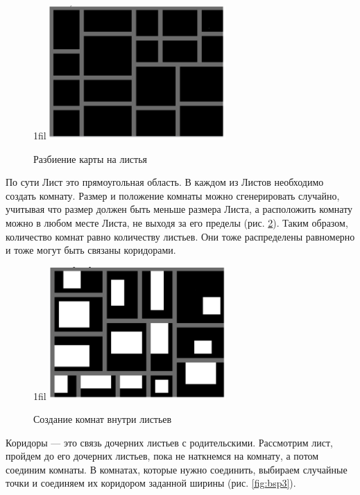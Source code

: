 \documentclass[a4paper,12pt]{report}
\makeatletter
\newcommand*{\centerfloat}{%
  \parindent \z@
  \leftskip \z@ \@plus 1fil \@minus \textwidth
  \rightskip\leftskip
  \parfillskip \z@skip}
\makeatother
\begin{document}
\begin{figure}
    \centerfloat
    \includegraphics[width=0.6\textwidth]{levels/2.png}
    \caption{Разбиение карты на листья \citep{bsp}}
    \label{fig:bsp}
\end{figure}

По сути Лист это прямоугольная область. В каждом из Листов необходимо создать комнату. Размер и положение комнаты можно сгенерировать случайно, учитывая что размер должен быть меньше размера Листа, а расположить комнату можно в любом месте Листа, не выходя за его пределы (рис. \ref{fig:bsp2}). Таким образом, количество комнат равно количеству листьев. Они тоже распределены равномерно и тоже могут быть связаны коридорами.

\begin{figure}
    \centerfloat
    \includegraphics[width=0.6\textwidth]{levels/3.png}
    \caption{Создание комнат внутри листьев \citep{bsp}}
    \label{fig:bsp2}
\end{figure}

Коридоры — это связь дочерних листьев с родительскими. Рассмотрим лист, пройдем до его дочерних листьев, пока не наткнемся на комнату, а потом соединим комнаты. В комнатах, которые нужно соединить, выбираем случайные точки и соединяем их коридором заданной ширины (рис. \ref{fig:bsp3}).
\end{document}
